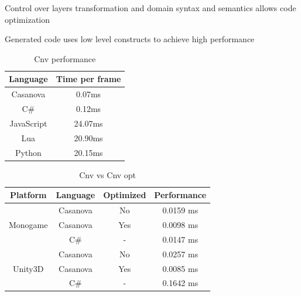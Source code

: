 \documentclass{beamer}
\begin{document}
\begin{slide}{
\item Control over layers transformation and domain syntax and semantics allows code optimization
\item Generated code uses low level constructs to achieve high performance
\item[] 
\hspace{-1cm}
\begin{minipage}[t]{.4\textwidth}
\begin{table}[!t]
\tiny
\caption{Cnv performance}
\begin{tabular}{|c||c|}
	\hline
	Language & Time per frame\\
	\hline
	Casanova & 0.07ms\\
	\hline
	C\# & 0.12ms\\
	\hline
	JavaScript & 24.07ms \\
	\hline
	Lua & 20.90ms\\
	\hline
	Python & 20.15ms \\
	\hline
\end{tabular}
\end{table}
\end{minipage}%
\begin{minipage}[t]{.6\textwidth}

\begin{table}[!ht]
\tiny
\caption{Cnv vs Cnv opt}
\begin{tabular}{ @{}|c|c|c|c|@{} }
\hline
Platform & Language & Optimized & Performance\\ \hline
\multirow{3}{*}{Monogame}
& Casanova & No & 0.0159 ms\\
& Casanova & Yes & 0.0098 ms\\
& C\# &   - & 0.0147 ms\\ \hline
\multirow{3}{*}{Unity3D}
& Casanova & No & 0.0257 ms\\
& Casanova & Yes & 0.0085 ms\\
& C\# &   - & 0.1642 ms\\ \hline
\hline
\end{tabular}
\end{table}
\end{minipage}
}\end{slide}
\end{document}
